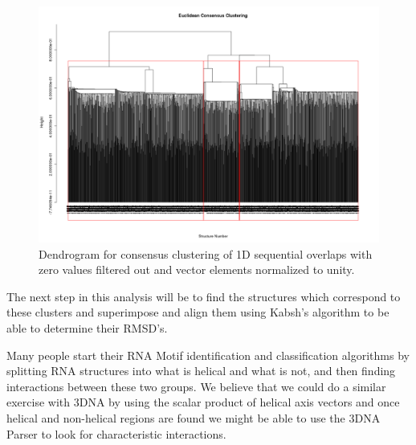 \begin{figure}[htbp]
\centering 
\includegraphics[angle=90, scale=0.6]{Chapter1/eucli_cons.png}
\caption{Dendrogram for consensus clustering of 1D sequential overlaps
  with zero values filtered out and vector elements normalized to unity.}
\end{figure}
The next step in this analysis will be to find the structures which
correspond to these clusters and superimpose and align them using
Kabsh's algorithm to be able to determine their RMSD's.

Many people start their RNA Motif identification and classification
algorithms by splitting RNA structures into what is helical and what
is not, and then finding interactions between these two groups. We
believe that we could do a similar exercise with 3DNA by using the scalar
product of helical axis vectors and once helical and non-helical
regions are found we might be able to use the 3DNA Parser to look for characteristic
interactions.





